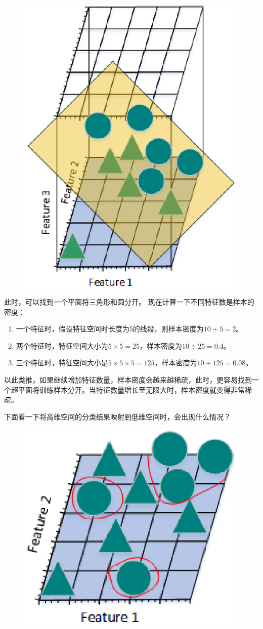  \begin{figure}[h]
   \centering
   \includegraphics[width=.5\textwidth]{imgs/2.21.1.4.eps}
 \end{figure}

此时，可以找到一个平面将三角形和圆分开。 现在计算一下不同特征数是样本的密度：

\begin{enumerate}\itemsep0em 
		\item 一个特征时，假设特征空间时长度为5的线段，则样本密度为$10 \div 5 = 2$。
		\item 两个特征时，特征空间大小为$ 5\times5 = 25$，样本密度为$10 \div 25 = 0.4$。
		\item 三个特征时，特征空间大小是$ 5\times5\times5 = 125$，样本密度为$10 \div 125 = 0.08$。
\end{enumerate}

以此类推，如果继续增加特征数量，样本密度会越来越稀疏，此时，更容易找到一个超平面将训练样本分开。当特征数量增长至无限大时，样本密度就变得非常稀疏。

下面看一下将高维空间的分类结果映射到低维空间时，会出现什么情况？

 \begin{figure}[h]
   \centering
   \includegraphics[width=.5\textwidth]{imgs/2.21.1.5.eps}
 \end{figure}

